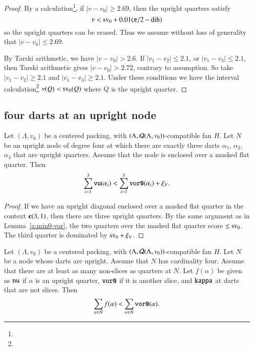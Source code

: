 \begin{proof}
By a calculation\footnote{}, if $|v-v_0|\ge 2.69$,
then the upright quarters satisfy
    $$\nu < {\operatorname{sv}}_0 + 0.01 (\pi/2-\operatorname{dih})$$
so the upright quarters can be erased.  Thus we assume without
loss of generality that $|v-v_0|\le 2.69$.

By Tarski arithmetic, we have $|v-v_0|>2.6$.
If $|v_1-v_2|\le 2.1$,  or $|v_1-v_3|\le 2.1$, then
Tarski arithmetic gives $|v-v_0|>2.72$, 
 contrary to assumption.  So take $|v_1-v_2|\ge 2.1$ and
$|v_1-v_3|\ge2.1$. Under these conditions we have the interval
calculation\footnote{} %
  $\nu(Q) < {\operatorname{sv}}_0(Q)$ where $Q$ is the upright quarter.
\end{proof}


\subsection{four darts at an upright node}


\begin{lemma}
\label{remark:3rd-quarter} 
Let $(\Lambda,v_0)$ be a centered packing, 
with $(\Lambda,{\mathcal Q}(\Lambda,v_0))$-compatible fan $H$.
Let $N$ be an upright node of degree four at which there are
exactly three darts $\alpha_1$, $\alpha_2$, $\alpha_3$
that are upright quarters.  Assume that the node is enclosed
over a masked flat quarter.  
Then
 $$
 \sum_{i=1}^3{\operatorname{{\texttt{vu}}}}(\alpha_i) <
     \sum_{i=1}^3{\operatorname{{\texttt{vor0}}}}(\alpha_i) + \xi_V.
 $$
\end{lemma}

\begin{proof}
 If we have an upright diagonal enclosed
over a masked flat quarter in the context ${\operatorname{\bf c}}{(3,1)}$, then there are
three upright quarters.  By the same argument as in Lemma~\ref{a:min0-vor}, 
the two quarters over the masked flat quarter score $\le{\operatorname{sv}}_0$. The
third quarter is dominated by ${\operatorname{sv}}_0 + \xi_V$.
\end{proof}


\begin{lemma}
Let $(\Lambda,v_0)$ be a centered packing, 
with $(\Lambda,{\mathcal Q}(\Lambda,v_0))$-compatible fan $H$.
Let $N$ be a node
whose darts are upright.  Assume that $N$ has cardinality four.
Assume that there are at least as many non-slices as quarters at $N$.
Let $f(\alpha)$ be given as ${\operatorname{{\texttt{nu}}}}$ if $\alpha$ is an upright
quarter, ${\operatorname{{\texttt{vor0}}}}$ if it is another slice, and
${\operatorname{{\texttt{kappa}}}}$ at darts that are not slices.  Then
  $$
  \sum_{\alpha\in N} f(\alpha) < \sum_{\alpha\in N} {\operatorname{{\texttt{vor0}}}}(\alpha).
  $$
\end{lemma}


